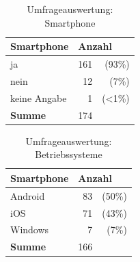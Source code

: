 \begin{table}[H]
\begin{center}
\begin{footnotesize}
\begin{tabular}{| l | r  r |}  \hline                       
  \textbf{Smartphone}              & \multicolumn{2}{|l|}{\textbf{Anzahl}}   \\ \hline 
  ja        &  161 &   (93\%)  \\  \hline  
  nein        &  12  &   (7\%)  \\  \hline  
  keine Angabe    &  1   &   (<1\%)  \\  \hline  
  \textbf{Summe}  & 174  &   \\  \hline  
\end{tabular}
\end{footnotesize}
\caption{Umfrageauswertung: Smartphone}
\label{tab:smartphone}
\end{center}
\end{table}

\begin{table}[H]
\begin{center}
\begin{footnotesize}
\begin{tabular}{| l | r  r |}  \hline                       
  \textbf{Smartphone}              & \multicolumn{2}{|l|}{\textbf{Anzahl}}   \\ \hline 
  Android    &  83 &   (50\%)  \\  \hline  
  iOS        &  71  &   (43\%)  \\  \hline  
  Windows    &  7   &   (7\%)  \\  \hline  
  \textbf{Summe}  & 166  &   \\  \hline  
\end{tabular}
\end{footnotesize}
\caption{Umfrageauswertung: Betriebssysteme}
\label{tab:os}
\end{center}
\end{table}


